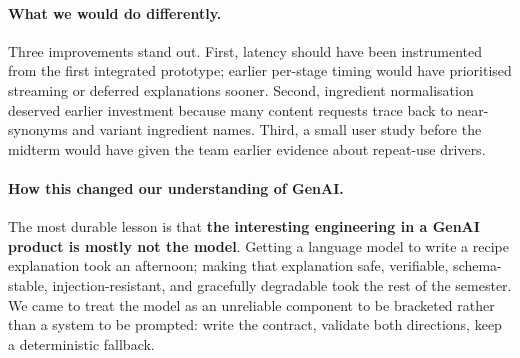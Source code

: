 \paragraph{What we would do differently.}
Three improvements stand out. First, latency should have been instrumented from
the first integrated prototype; earlier per-stage timing would have prioritised
streaming or deferred explanations sooner. Second, ingredient normalisation
deserved earlier investment because many content requests trace back to
near-synonyms and variant ingredient names. Third, a small user study before the
midterm would have given the team earlier evidence about repeat-use drivers.

\paragraph{How this changed our understanding of GenAI.}
The most durable lesson is that \textbf{the interesting engineering in a GenAI
product is mostly not the model}. Getting a language model to write a recipe
explanation took an afternoon; making that explanation safe, verifiable,
schema-stable, injection-resistant, and gracefully degradable took the rest of
the semester. We came to treat the model as an unreliable component to be
bracketed rather than a system to be prompted: write the contract, validate
both directions, keep a deterministic fallback.
